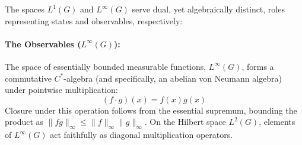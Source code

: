 \documentclass[11pt]{article}
\begin{document}
The spaces $L^1(G)$ and $L^\infty(G)$ serve dual, yet algebraically distinct, roles representing states and observables, respectively:

\paragraph{The Observables ($L^\infty(G)$):}
The space of essentially bounded measurable functions, $L^\infty(G)$, forms a commutative $C^*$-algebra (and specifically, an abelian von Neumann algebra) under pointwise multiplication:
\begin{equation}
    (f \cdot g)(x) = f(x)g(x)
\end{equation}
Closure under this operation follows from the essential supremum, bounding the product as $\|fg\|_\infty \leq \|f\|_\infty \|g\|_\infty$. On the Hilbert space $L^2(G)$, elements of $L^\infty(G)$ act faithfully as diagonal multiplication operators.
\end{document}
